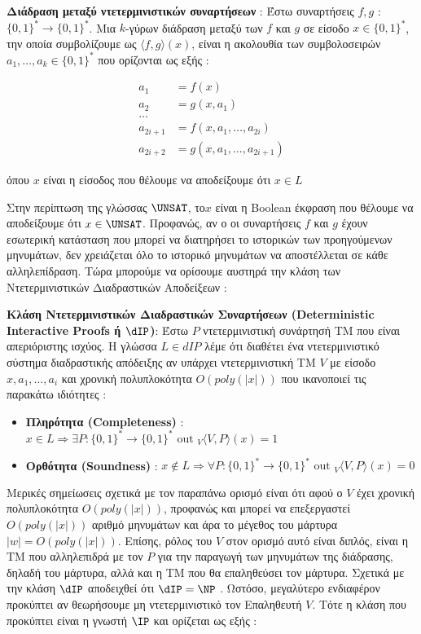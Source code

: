 \begin{definition}
\textbf{Διάδραση μεταξύ ντετερμινιστικών συναρτήσεων} : Έστω συναρτήσεις $f, g$ : $\{0,1\}^{*} \rightarrow\{0,1\}^{*}$. Μια $k$-γύρων διάδραση μεταξύ των $f$ και $g$ σε είσοδο $x \in\{0,1\}^{*}$, την οποία συμβολίζουμε ως $\langle f, g\rangle(x)$, είναι η ακολουθία των συμβολοσειρών $a_{1}, \ldots, a_{k} \in\{0,1\}^{*}$ που ορίζονται ως εξής :

\[
\begin{aligned}
a_{1} &=f(x) \\
a_{2} &=g(x, a_{1}) \\
\ldots & \\
a_{2 i+1} &=f(x, a_{1}, \ldots, a_{2 i}) \\
a_{2 i+2} &=g(x, a_{1}, \ldots, a_{2 i+1})
\end{aligned}
\]

όπου $x$ είναι η είσοδος που θέλουμε να αποδείξουμε ότι $x \in L$
\end{definition}

Στην περίπτωση της γλώσσας $\UNSAT$, το$x$ είναι η Boolean έκφραση που θέλουμε να αποδείξουμε ότι $x \in \UNSAT$. Προφανώς, αν ο οι συναρτήσεις $f$ και $g$ έχουν εσωτερική κατάσταση που μπορεί να διατηρήσει το ιστορικών των προηγούμενων μηνυμάτων, δεν χρειάζεται όλο το ιστορικό μηνυμάτων να αποστέλλεται σε κάθε αλληλεπίδραση. Τώρα μπορούμε να ορίσουμε αυστηρά την κλάση των Ντετερμινιστικών Διαδραστικών Αποδείξεων :

\begin{definition}
\textbf{Κλάση Ντετερμινιστικών Διαδραστικών Συναρτήσεων (Deterministic Interactive Proofs ή $\dIP$)}: Έστω $P$ ντετερμινιστική συνάρτησή ΤΜ που είναι απεριόριστης ισχύος. Η γλώσσα $L \in dIP$ λέμε ότι διαθέτει ένα ντετερμινιστικό σύστημα διαδραστικής απόδειξης αν υπάρχει ντετερμινιστική TM $V$ με είσοδο $x, a_{1}, \ldots, a_{i}$ και χρονική πολυπλοκότητα $O(poly(|x|))$ που ικανοποιεί τις παρακάτω ιδιότητες :
\begin{itemize}
    \item \textbf{Πληρότητα (Completeness)} : $x \in L \Rightarrow \exists P:\{0,1\}^{*} \rightarrow\{0,1\}^{*} \text { out }_{V}\langle V, P\rangle(x) = 1$
    \item \textbf{Ορθότητα (Soundness)} : $x \notin L \Rightarrow \forall P:\{0,1\}^{*} \rightarrow\{0,1\}^{*} \text { out }_{V}\langle V, P\rangle(x) = 0$
\end{itemize}
\end{definition}

Μερικές σημείωσεις σχετικά με τον παραπάνω ορισμό είναι ότι αφού ο $V$ έχει χρονική πολυπλοκότητα $O(poly(|x|))$, προφανώς και μπορεί να επεξεργαστεί $O(poly(|x|))$ αριθμό μηνυμάτων και άρα το μέγεθος του μάρτυρα $|w|=O(poly(|x|))$. Επίσης, ρόλος του $V$ στον ορισμό αυτό είναι διπλός, είναι η ΤΜ που αλληλεπιδρά με τον $P$ για την παραγωγή των μηνυμάτων της διάδρασης, δηλαδή του μάρτυρα, αλλά και η ΤΜ που θα επαληθεύσει τον μάρτυρα. Σχετικά με την κλάση  $\dIP$ αποδειχθεί ότι $\dIP = \NP$ . Ωστόσο, μεγαλύτερο ενδιαφέρον προκύπτει αν θεωρήσουμε μη ντετερμινιστικό τον Επαληθευτή $V$. Τότε η κλάση που προκύπτει είναι η γνωστή $\IP$ και ορίζεται ως εξής :

